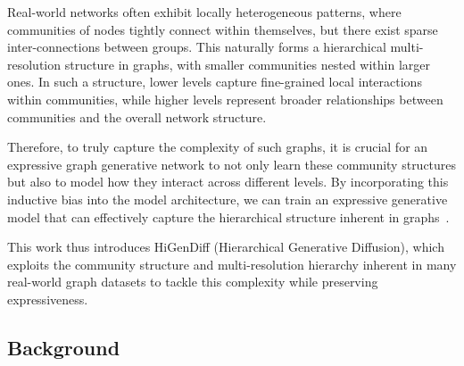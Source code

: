 Real-world networks often exhibit locally heterogeneous patterns, where communities of nodes tightly connect within themselves, but there exist sparse inter-connections between groups.
This naturally forms a hierarchical multi-resolution structure in graphs, with smaller communities nested within larger ones. In such a structure, lower levels capture fine-grained local interactions within communities, while higher levels represent broader relationships between communities and
the overall network structure. 

Therefore, to truly capture the complexity of such graphs, it is crucial for an expressive graph generative network to not only learn these community structures but also to model how they interact across different levels. By incorporating this inductive bias into the model architecture, we can train an expressive generative model that can effectively capture the hierarchical structure inherent in graphs~\cite{karami_multi-resolution_2024}. 

This work thus introduces HiGenDiff (Hierarchical Generative Diffusion), which exploits the community structure and multi-resolution hierarchy inherent in many real-world graph datasets to tackle this complexity while preserving expressiveness.

\subsection{Background}

